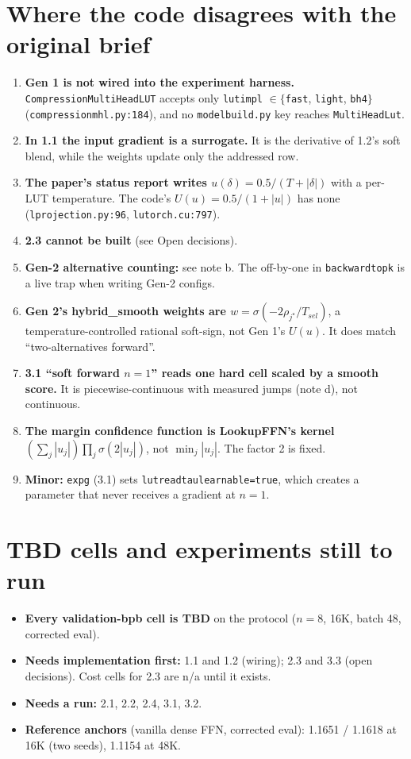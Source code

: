 \documentclass[10pt]{article}
\newcommand{\code}[1]{{\renewcommand{\_}{\textunderscore\allowbreak}\texttt{#1}}}
\begin{document}
\section*{Where the code disagrees with the original brief}
\begin{enumerate}\setlength\itemsep{1pt}
\item \textbf{Gen 1 is not wired into the experiment harness.} \code{CompressionMultiHeadLUT} accepts only \code{lut\_impl} $\in\{$\code{fast}, \code{light}, \code{bh4}$\}$ (\code{compression\_mhl.py:184}),
  and no \code{model\_build.py} key reaches \code{MultiHeadLut}.
\item \textbf{In 1.1 the input gradient is a surrogate.} It is the derivative of 1.2's soft blend, while the weights update only the addressed row.
\item \textbf{The paper's status report writes $u(\delta)=0.5/(T+|\delta|)$} with a per-LUT temperature. The code's $U(u)=0.5/(1+|u|)$ has none
  (\code{l\_projection.py:96}, \code{lutorch.cu:797}).
\item \textbf{2.3 cannot be built} (see Open decisions).
\item \textbf{Gen-2 alternative counting:} see note b. The off-by-one in \code{backward\_topk} is a live trap when writing Gen-2 configs.
\item \textbf{Gen 2's hybrid\_smooth weights are $w=\sigma(-2\rho_{j^\star}/T_{sel})$}, a temperature-controlled rational soft-sign, not Gen 1's $U(u)$. It does match ``two-alternatives forward''.
\item \textbf{3.1 ``soft forward $n{=}1$'' reads one hard cell scaled by a smooth score.} It is piecewise-continuous with measured jumps (note d), not continuous.
\item \textbf{The margin confidence function is LookupFFN's kernel} $(\sum_j|u_j|)\prod_j\sigma(2|u_j|)$, not $\min_j|u_j|$. The factor 2 is fixed.
\item \textbf{Minor:} \code{exp\_g\_0207} (3.1) sets \code{lut\_read\_tau\_learnable=true}, which creates a parameter that never receives a gradient at $n=1$.
\end{enumerate}

\section*{TBD cells and experiments still to run}
\begin{itemize}\setlength\itemsep{1pt}
\item \textbf{Every validation-bpb cell is TBD} on the protocol ($n=8$, 16K, batch 48, corrected eval).
\item \textbf{Needs implementation first:} 1.1 and 1.2 (wiring); 2.3 and 3.3 (open decisions). Cost cells for 2.3 are n/a until it exists.
\item \textbf{Needs a run:} 2.1, 2.2, 2.4, 3.1, 3.2.
\item \textbf{Reference anchors} (vanilla dense FFN, corrected eval): 1.1651 / 1.1618 at 16K (two seeds), 1.1154 at 48K.
\end{itemize}
\end{document}
